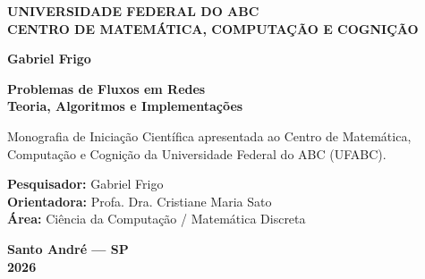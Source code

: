 \thispagestyle{empty}

\begin{center}
    {\large\textbf{UNIVERSIDADE FEDERAL DO ABC}}\\[0.2cm]
    {\large\textbf{CENTRO DE MATEMÁTICA, COMPUTAÇÃO E COGNIÇÃO}}
\end{center}

\vfill

\begin{center}
    {\Large\textbf{Gabriel Frigo}}
\end{center}

\vfill

\begin{center}
    {\fontsize{22}{27}\selectfont\textbf{Problemas de Fluxos em Redes}}\\[0.35cm]
    {\fontsize{17}{22}\selectfont\textbf{Teoria, Algoritmos e Implementações}}\par
\end{center}

\vfill

\begin{flushright}
\begin{minipage}{0.58\textwidth}
\small
{}
Monografia de Iniciação Científica apresentada ao Centro de Matemática, Computação e Cognição da Universidade Federal do ABC (UFABC).\par
\vspace{0.45cm}
\textbf{Pesquisador:} Gabriel Frigo\\
\textbf{Orientadora:} Profa. Dra. Cristiane Maria Sato\\
\textbf{Área:} Ciência da Computação / Matemática Discreta
\end{minipage}
\end{flushright}

\vfill

\begin{center}
    \textbf{Santo André --- SP}\\
    \textbf{2026}
\end{center}

\newpage
